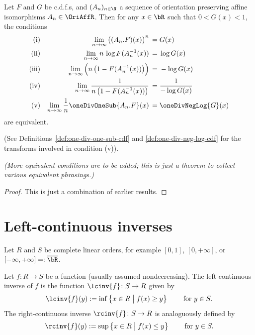 

\begin{theorem}
  \label{thm:tfae-ev-limit}
  \leanok
  Let $F$ and $G$ be c.d.f.s, and $(A_n)_{n \in \N}$ a sequence of orientation
  preserving affine isomorphisms $A_n \in \OriAffR$. Then for any $x \in \bR$
  such that $0 < G(x) < 1$, the conditions
  \begin{align*}
    \text{(i)} & & \lim_{n \to \infty} \big( (A_n.F)(x) \big)^n \, = \; & G(x) \\
    \text{(ii)} & & \lim_{n \to \infty} n \, \log F (A_n^{-1}(x)) \, = \; & \log G(x) \\
    \text{(iii)} & & \lim_{n \to \infty} \Big( n \, \big(1 - F (A_n^{-1}(x)) \big) \Big)
      \, = \; & - \log G(x) \\
    \text{(iv)} & & \lim_{n \to \infty} \frac{1}{n \, \big(1 - F (A_n^{-1}(x)) \big)}
      \, = \; & \frac{1}{-\log G(x)} \\
    \text{(v)} & & \lim_{n \to \infty} \frac{1}{n} \oneDivOneSub{A_n . F} (x)
      \, = \; & \oneDivNegLog{G} (x)
  \end{align*}
  are equivalent.

  (See Definitions~\ref{def:one-div-one-sub-cdf}
  and \ref{def:one-div-neg-log-cdf} for the transforms involved in condition (v)).

  \emph{(More equivalent conditions are to be added; this is just a theorem to collect
  various equivalent phrasings.)}
\end{theorem}
\begin{proof}
  \leanok
  This is just a combination of earlier results.
\end{proof}


\chapter{Left-continuous inverses}

Let $R$ and $S$ be complete linear orders, for example $[0,1]$, $[0,+\infty]$, or
$[-\infty,+\infty] =: \overline{\bR}$.

\begin{definition}
  \label{def:lc-inverse}
  \leanok
  Let $f \colon R \to S$ be a function (usually assumed nondecreasing).
  The left-continuous inverse of $f$ is the function $\lcinv{f} \colon S \to R$
  given by
  \begin{align*}
    \lcinv{f}(y) := \inf \big\{ x \in R \; \big| \; f(x) \ge y \big\}
    \qquad \text{ for } y \in S.
  \end{align*}
  The right-continuous inverse $\rcinv{f} \colon S \to R$ is analoguously defined by
  \begin{align*}
    \rcinv{f}(y) := \sup \big\{ x \in R \; \big| \; f(x) \le y \big\}
    \qquad \text{ for } y \in S.
  \end{align*}
\end{definition}


